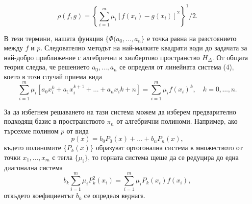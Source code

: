 \documentclass[12pt]{article}
\numberwithin{equation}{section}
\numberwithin{theorem}{section}
\numberwithin{definition}{section}
\numberwithin{corollary}{section}
\begin{document}
\[
\rho(f,g) = \left\{\displaystyle\sum_{i=1}^m\mu_i[f(x_i)-g(x_i)]^2\right\}^1/2.
\]
\par
В тези термини, нашата функция $\{\Phi(a_0,\dotso,a_n\}$ е точка равна на разстоянието между $f$ и $p$. Следователно методът на най-малките квадрати води до задачата за най-добро приближение с алгебрични в хилбертово пространство $H_\Delta$. От общата теория следва, че решението $a_0,\dotso,a_n$ се определя от линейната система (4), което в този случай приема вида
\[
\displaystyle\sum_{i=1}^m\mu_i[a_0x_i^k+a_1x_i^{k+1}+\dotso+a_nx_i{k+n}] = 
\displaystyle\sum_{i=1}^m\mu_if(x_i)^k,\hspace{12pt}k = 0,\dotso,n.
\]
\par
За да избегнем решаването на тази система можем да изберем предварително подходящ базис в пространството $\pi_n$ от алгебрични полиноми. Например, ако търсехме полином $p$ от вида
\[
p(x) = b_0P_0(x)+\dotso+b_nP_n(x),
\]
където полиномите $\{P_k(x)\}$ образуват ортогонална система в множеството от точки $x_1,\dotso, x_m$ с тегла $\{\mu_i\}$, то горната система щеше да се редуцира до една диагонална система
\[
b_k\displaystyle\sum_{i=1}^m\mu_iP_k^2(x_i) = 
\displaystyle\sum_{i=1}^m\mu_iP_k(x_i)f(x_i),
\]
откъдето коефициентът $b_k$ се определя веднага.
\newpage
\end{document}
